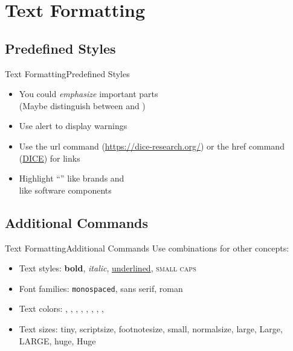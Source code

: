 \documentclass{beamer}
\begin{document}
\section{Text Formatting}
\subsection{Predefined Styles}
\begin{frame}{Text Formatting}{Predefined Styles}
	\begin{itemize}
		\item You could \emph{emphasize} important parts \\(Maybe distinguish between  and )
		\item Use alert to display \alert{warnings}
		\item Use the url command (\url{https://dice-research.org/}) or the href command (\href{https://dice-research.org/}{DICE}) for links
		\item Highlight ``'' like brands and\\  like software components
	\end{itemize}
\end{frame}

\subsection{Additional Commands}
\begin{frame}{Text Formatting}{Additional Commands}
	Use combinations for other concepts:
	\begin{itemize}
		\item Text styles: \textbf{bold}, \textit{italic}, \underline{underlined}, \textsc{small caps}
		\item Font families: \texttt{monospaced}, \textsf{sans serif}, \textrm{roman}
		\item Text colors:
			,
			,
			,
			,
			,
			,
			,
			,
		\item Text sizes: {\tiny tiny}, {\scriptsize scriptsize}, {\footnotesize footnotesize}, {\small small}, {\normalsize normalsize}, {\large large}, {\Large Large}, {\LARGE LARGE}, {\huge huge}, {\Huge Huge}
	\end{itemize}
\end{frame}
\end{document}
